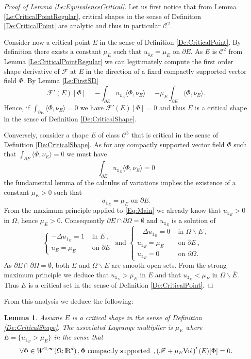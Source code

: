 \documentclass{article}
\newcommand{\R}{\textnormal{I\kern-0.21emR}}
\newtheorem{lemma}[material]{Lemma}
\def\O{{\Omega}}
\numberwithin{equation}{section}
\begin{document}
\begin{proof}[Proof of Lemma \ref{Le:EquivalenceCritical}]
Let us first notice that from Lemma \ref{Le:CriticalPointRegular}, critical shapes in the sense of Definition \ref{De:CriticalPoint} are analytic and thus in particular $\mathscr C^2$. 

Consider now a critical point $E$ in the sense of Definition \ref{De:CriticalPoint}. By definition there exists a constant $\mu_E$ such that $u_{\mathds 1_E}=\mu_E$ on $\partial E$. As $E$ is $\mathscr C^2$ from Lemma \ref{Le:CriticalPointRegular} we can legitimately compute the first order shape derivative of $\mathscr F$ at $E$ in the direction of a fixed compactly supported vector field $\Phi$. By Lemma \ref{Le:FirstSD}
\[ \mathscr F'(E)[\Phi]=-\int_{\partial E}u_{\mathds 1_E}\langle \Phi,\nu_E\rangle=-\mu_E\int_{\partial E}\langle \Phi,\nu_E\rangle.\] Hence, if $\int_{\partial E}\langle \Phi,\nu_E\rangle=0$ we have $\mathscr F'(E)[\Phi]=0$ and thus $E$ is a critical shape in the sense of Definition \ref{De:CriticalShape}.

Conversely, consider a shape $E$ of class $\mathscr C^3$ that is critical in the sense of Definition \ref{De:CriticalShape}. As for any compactly supported vector field $\Phi$ such that $\int_{\partial E}\langle \Phi,\nu_E\rangle=0$ we must have 
\[ \int_{\partial E}u_{\mathds 1_E}\langle \Phi,\nu_E\rangle=0\] the fundamental lemma of the calculus of variations implies the existence of a constant $\mu_E>0$ such that 
\[u_{\mathds 1_E}=\mu_E\text{ on }\partial E.\] From the maximum principle applied to \eqref{Eq:Main} we already know that $u_{\mathds 1_E}>0$ in $\O$, hence $\mu_E>0$. Consequently $\partial E\cap \partial \O=\emptyset$ and $u_{\mathds 1_E}$ is a solution of 
\begin{equation}
\begin{cases}-\Delta u_{\mathds 1_E}=1&\text{ in }E\,, 
\\ u_E=\mu_E&\text{ on }\partial E\end{cases}\text{ and } \begin{cases}-\Delta u_{\mathds 1_E}=0&\text{ in }\O\backslash \overline E\,, \\u_{\mathds 1_E}=\mu_E&\text{ on }\partial E\,, \\ u_{\mathds 1_E}=0&\text{ on }\partial \O.\end{cases}\end{equation} As $\partial E\cap \partial \O=\emptyset$, both $E$ and $\O\backslash \overline E$ are smooth open sets. From the strong maximum principle we deduce that $u_{\mathds 1_E}>\mu_E$ in $E$ and that $u_{\mathds 1_E}<\mu_E$ in $\O\backslash \overline E$. Thus $E$ is a critical set in the sense of Definition \ref{De:CriticalPoint}.
\end{proof}
From this analysis we deduce the following:
\begin{lemma}\label{Le:LagrangeMultiplier}
Assume $E$ is a critical shape in the sense of Definition \ref{De:CriticalShape}. The associated Lagrange multiplier is $\mu_E$ where $E=\{u_{\mathds 1_E}>\mu_E\}$ in the sense that 
\[ \forall \Phi\in W^{2,\infty}(\O;\R^d)\,, \Phi \text{ compactly supported }\,, \left(\mathscr F+\mu_E\mathrm{Vol}\right)'(E)[\Phi]=0.\]
\end{lemma}
\end{document}
